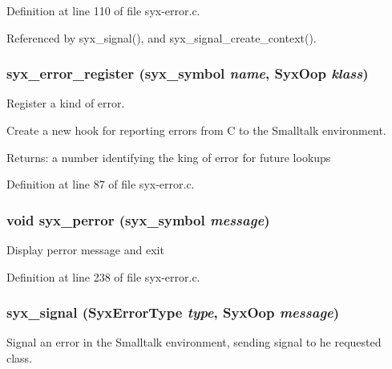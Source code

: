 Definition at line 110 of file syx-error.c.

Referenced by syx\_\-signal(), and syx\_\-signal\_\-create\_\-context().\hypertarget{syx-error_8c_8bfbf6b690f699fb8e74ab4d0b48fc32}{
\subsubsection{ syx\_\-error\_\-register ({\bf syx\_\-symbol} {\em name}, \/  {\bf SyxOop} {\em klass})}}
\label{syx-error_8c_8bfbf6b690f699fb8e74ab4d0b48fc32}


Register a kind of error.

Create a new hook for reporting errors from C to the Smalltalk environment.

\begin{Desc}
\item[Returns:]a number identifying the king of error for future lookups \end{Desc}


Definition at line 87 of file syx-error.c.\hypertarget{syx-error_8c_fa1c783d0fae07f610888805115a6733}{
\subsubsection{\setlength{\rightskip}{0pt plus 5cm}void syx\_\-perror ({\bf syx\_\-symbol} {\em message})}}
\label{syx-error_8c_fa1c783d0fae07f610888805115a6733}


Display perror message and exit 

Definition at line 238 of file syx-error.c.\hypertarget{syx-error_8c_0b4ecf0c440811157a5bc63545665742}{
\subsubsection{ syx\_\-signal ({\bf SyxErrorType} {\em type}, \/  {\bf SyxOop} {\em message})}}
\label{syx-error_8c_0b4ecf0c440811157a5bc63545665742}


Signal an error in the Smalltalk environment, sending signal to he requested class.

